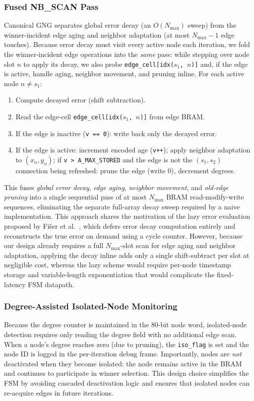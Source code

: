\documentclass[conference]{IEEEtran}
\begin{document}
\subsubsection{Fused NB\_SCAN Pass}
Canonical GNG separates global error decay (an $O(N_{\max})$ sweep) from the winner-incident edge aging and neighbor adaptation (at most $N_{\max}-1$ edge touches). Because error decay must visit every active node each iteration, we fold the winner-incident edge operations into the \emph{same} pass: while stepping over node slot $n$ to apply its decay, we also probe \texttt{edge\_cell[idx($s_1$, $n$)]} and, if the edge is active, handle aging, neighbor movement, and pruning inline. For each active node $n \neq s_1$:
\begin{enumerate}
  \item Compute decayed error (shift subtraction).
  \item Read the edge-cell \texttt{edge\_cell[idx($s_1$, $n$)]} from edge BRAM.
  \item If the edge is inactive (\texttt{v == 0}): write back only the decayed error.
  \item If the edge is active: increment encoded age (\texttt{v++}); apply neighbor adaptation to $(x_n, y_n)$; if \texttt{v > A\_MAX\_STORED} and the edge is not the $(s_1, s_2)$ connection being refreshed: prune the edge (write 0), decrement degrees.
\end{enumerate}
This fuses \emph{global error decay}, \emph{edge aging}, \emph{neighbor movement}, and \emph{old-edge pruning} into a single sequential pass of at most $N_{\max}$ BRAM read-modify-write sequences, eliminating the separate full-array decay sweep required by a naive implementation. This approach shares the motivation of the lazy error evaluation proposed by Fi\v{s}er et al.~\cite{Fiser2013Efficient}, which defers error decay computation entirely and reconstructs the true error on demand using a cycle counter. However, because our design already requires a full $N_{\max}$-slot scan for edge aging and neighbor adaptation, applying the decay inline adds only a single shift-subtract per slot at negligible cost, whereas the lazy scheme would require per-node timestamp storage and variable-length exponentiation that would complicate the fixed-latency FSM datapath.

\subsubsection{Degree-Assisted Isolated-Node Monitoring}
Because the degree counter is maintained in the 80-bit node word, isolated-node detection requires only reading the degree field with no additional edge scan. When a node's degree reaches zero (due to pruning), the \texttt{iso\_flag} is set and the node ID is logged in the per-iteration debug frame. Importantly, nodes are \emph{not} deactivated when they become isolated: the node remains active in the BRAM and continues to participate in winner selection. This design choice simplifies the FSM by avoiding cascaded deactivation logic and ensures that isolated nodes can re-acquire edges in future iterations.
\end{document}
